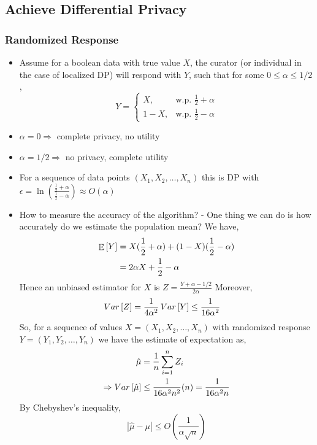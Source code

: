 \documentclass{article}
\begin{document}
\subsection{Achieve Differential Privacy}
\subsubsection{Randomized Response}
\begin{itemize}
    \item Assume for a boolean data with true value $X$, the curator (or individual in the case of localized DP) will respond with $Y$, such that for some $0 \leq \alpha \leq 1/2$,
    $$Y = \begin{cases} X, & \text{w.p. } \frac{1}{2}+\alpha \\ 1-X, & \text{w.p. } \frac{1}{2}-\alpha \end{cases}$$
    \item $\alpha=0 \Rightarrow$ complete privacy, no utility
    \item $\alpha=1/2 \Rightarrow$ no privacy, complete utility
    \item For a sequence of data points $(X_1, X_2, \dots, X_n)$ this is DP with $\epsilon = \ln{\left(\frac{\frac{1}{2}+\alpha}{\frac{1}{2}-\alpha}\right)} \approx O(\alpha)$
    \item How to measure the accuracy of the algorithm? - One thing we can do is how accurately do we estimate the population mean? We have,
    \begin{align*}
        \mathop{\mathbb{E}}\left[ Y \right] &= X(\frac{1}{2} + \alpha) + (1-X) (\frac{1}{2} - \alpha)\\
        &= 2\alpha X + \frac{1}{2} - \alpha
    \end{align*}
    Hence an unbiased estimator for $X$ is $Z = \frac{Y+\alpha - 1/2}{2\alpha}$
    Moreover,
    \begin{align*}
        \mathop{Var}\left[ Z \right] &= \frac{1}{4\alpha^2} \mathop{Var}\left[ Y \right] \leq \frac{1}{16 \alpha^2}
    \end{align*}
    So, for a sequence of values $X = (X_1, X_2, \dots, X_n)$ with randomized response $Y = (Y_1, Y_2, \dots, Y_n)$ we have the estimate of expectation as,
    \begin{align*}
        \hat \mu &= \frac{1}{n} \sum_{i=1}^n Z_i\\
        \Rightarrow \mathop{Var}\left[ \hat\mu \right] &\leq \frac{1}{16\alpha^2 n^2} (n) = \frac{1}{16 \alpha^2 n}
    \end{align*}
    By Chebyshev's inequality,
    $$|\hat\mu - \mu| \leq O(\frac{1}{\alpha \sqrt{n}})$$
\end{itemize}
\end{document}
